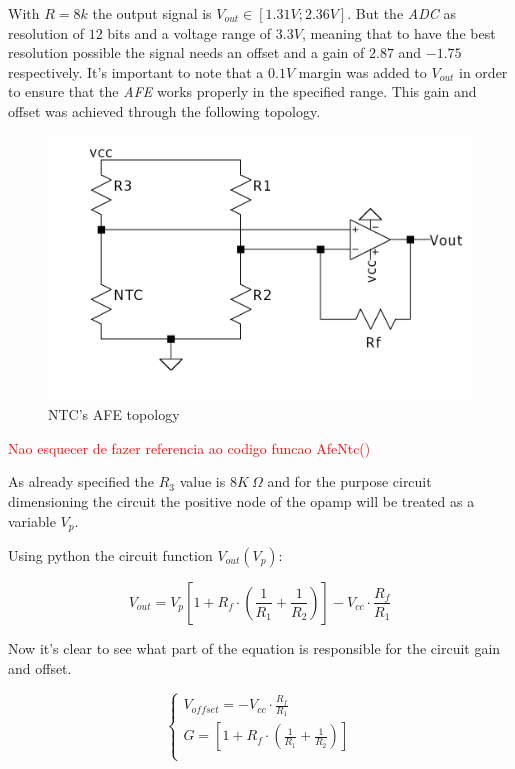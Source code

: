 \documentclass[12pt]{article}
\begin{document}
    With $R=8k$ the output signal is $V_{out} \in [1.31V;2.36V]$. 
    But the \textit{ADC} as resolution of $12$ bits and a voltage range of $3.3V$, meaning that to have the best resolution possible the signal needs an offset and a gain of $2.87$ and $-1.75$ respectively. 
    It's important to note that a $0.1V$ margin was added to $V_{out}$ in order to ensure that the \textit{AFE} works properly in the specified range.
    This gain and offset was achieved through the following topology.
    
    \begin{figure}[H] 
        \centering
        \includegraphics*[scale = 0.25]{images/AFENTC.png}
        \caption{NTC's AFE topology}
        \label{wrap-fig:1}
    \end{figure}

    \textcolor{red}{Nao esquecer de fazer referencia ao codigo funcao AfeNtc()}

    As already specified the $R_3$ value is $8K~\Omega$ and for the purpose circuit dimensioning the circuit 
    the positive node of the opamp will be treated as a variable $V_p$.

    Using python the circuit function $V_{out}(V_p)$:
    
    \begin{equation}
        V_{out} = V_p\left[ 1 + R_f\cdot\left(\frac{1}{R_1} + \frac{1}{R_2}\right) \right] - V_{cc}\cdot\frac{R_f}{R_1}
    \end{equation}

    Now it's clear to see what part of the equation is responsible for the circuit gain and offset.
    
    \begin{equation}
        \begin{cases}
            V_{offset} = - V_{cc}\cdot\frac{R_f}{R_1}\\
            G = \left[ 1 + R_f\cdot\left(\frac{1}{R_1} + \frac{1}{R_2}\right) \right]\\
        \end{cases}
    \end{equation}
\end{document}
